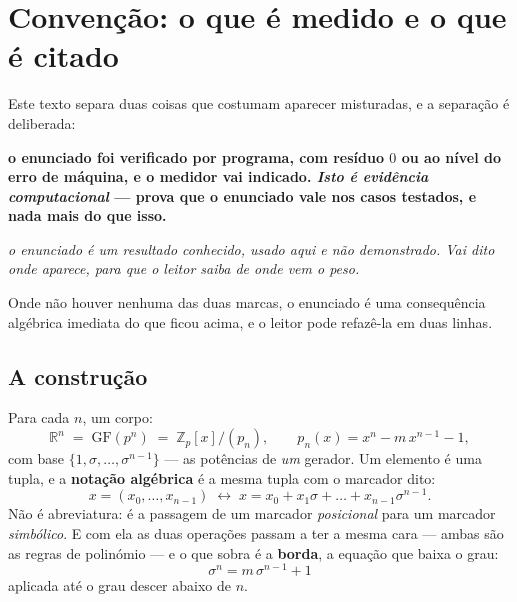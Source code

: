 \documentclass[11pt]{article}
\newcommand{\Z}{\mathbb Z}
\newcommand{\R}{\mathbb R}
\newcommand{\GF}{\mathrm{GF}}
\theoremstyle{plain}
\theoremstyle{remark}
\providecommand{\citado}[1]{\emph{#1}}
\providecommand{\medido}[1]{\textbf{#1}}
\begin{document}
\section*{Convenção: o que é medido e o que é citado}

Este texto separa duas coisas que costumam aparecer misturadas, e a separação é deliberada:

\medido{o enunciado foi verificado por programa, com resíduo $0$ ou ao nível do erro de máquina,
e o medidor vai indicado. \emph{Isto é evidência computacional} --- prova que o enunciado vale
nos casos testados, e nada mais do que isso.}

\citado{o enunciado é um resultado conhecido, usado aqui e \emph{não} demonstrado. Vai dito onde
aparece, para que o leitor saiba de onde vem o peso.}

\noindent Onde não houver nenhuma das duas marcas, o enunciado é uma consequência algébrica
imediata do que ficou acima, e o leitor pode refazê-la em duas linhas.

\subsection{A construção}

Para cada $n$, um corpo:
\[
 \R^n \;=\; \GF(p^n) \;=\; \Z_p[x]/(p_n),\qquad p_n(x)=x^n-m\,x^{n-1}-1,
\]
com base $\{1,\sigma,\dots,\sigma^{n-1}\}$ --- as potências de \emph{um} gerador. Um elemento é uma
tupla, e a \textbf{notação algébrica} é a mesma tupla com o marcador dito:
\[
 x=(x_0,\dots,x_{n-1}) \;\longleftrightarrow\; x = x_0 + x_1\sigma + \dots + x_{n-1}\sigma^{n-1}.
\]
Não é abreviatura: é a passagem de um marcador \emph{posicional} para um marcador \emph{simbólico}.
E com ela as duas operações passam a ter a mesma cara --- ambas são as regras de polinómio --- e o
que sobra é a \textbf{borda}, a equação que baixa o grau:
\[
 \boxed{\;\sigma^n = m\,\sigma^{n-1} + 1\;}
\]
aplicada até o grau descer abaixo de $n$.
\end{document}
